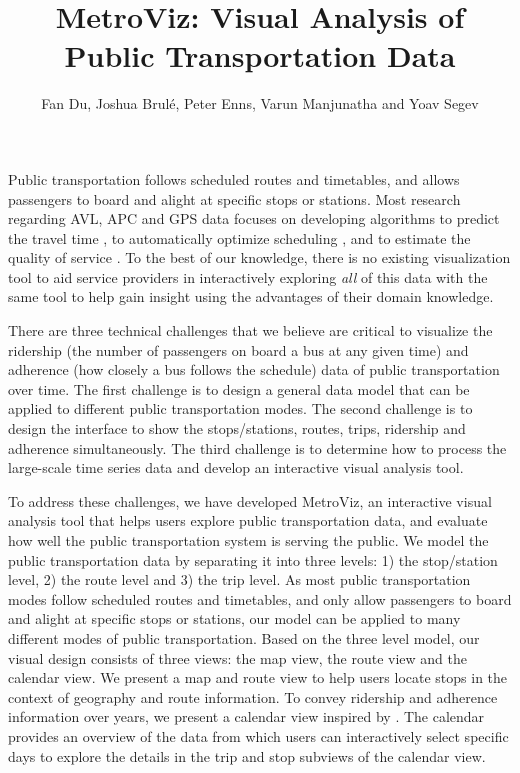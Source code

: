 \documentclass[journal]{vgtc}
\title{MetroViz: Visual Analysis of Public Transportation Data}
\author{Fan Du, Joshua Brulé, Peter Enns, Varun Manjunatha and Yoav Segev}
\begin{document}

\maketitle

Public transportation follows scheduled routes and timetables, and allows passengers to board and alight at specific stops or stations. Most research regarding AVL, APC and GPS data focuses on developing algorithms to predict the travel time \cite{Lee:2012:HNF:2424321.2424357,Tiesyte:2008:SPT:1463434.1463452,Predic2007}, to automatically optimize scheduling \cite{4658140,Yu2007}, and to estimate the quality of service \cite{camus2005estimation,hammerle2005use}. To the best of our knowledge, there is no existing visualization tool to aid service providers in interactively exploring \emph{all} of this data with the same tool to help gain insight using the advantages of their domain knowledge.

There are three technical challenges that we believe are critical to visualize the ridership (the number of passengers on board a bus at any given time) and adherence (how closely a bus follows the schedule) data of public transportation over time. The first challenge is to design a general data model that can be applied to different public transportation modes. The second challenge is to design the interface to show the stops/stations, routes, trips, ridership and adherence simultaneously. The third challenge is to determine how to process the large-scale time series data and develop an interactive visual analysis tool.

To address these challenges, we have developed MetroViz, an interactive visual analysis tool that helps users explore public transportation data, and evaluate how well the public transportation system is serving the public. 
We model the public transportation data by separating it into three levels: 1) the stop/station level, 2) the route level and 3) the trip level. As most public transportation modes follow scheduled routes and timetables, and only allow passengers to board and alight at specific stops or stations, our model can be applied to many different modes of public transportation.
Based on the three level model, our visual design consists of three views: the map view, the route view and the calendar view.
We present a map and route view to help users locate stops in the context of geography and route information. To convey ridership and adherence information over years, we present a calendar view inspired by \cite{wicklin2009congestion}. The calendar provides an overview of the data from which users can interactively select specific days to explore the details in the trip and stop subviews of the calendar view.
\end{document}
